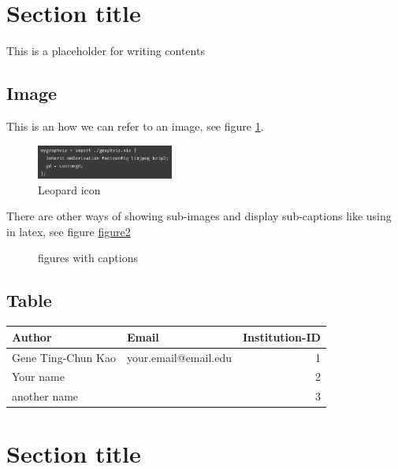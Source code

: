\documentclass[a4paper,11pt]{article}
\author{Ryu Shinyoung}
\date{}
\title{}
\begin{document}
\section*{Section title}
\label{sec:org1aff900}

This is a placeholder for writing contents


\subsection*{Image}
\label{sec:org142b079}

This is an how we can refer to an image, see figure \ref{fig:leopard-icon}.

\begin{figure}[htbp]
\centering
\includegraphics[width=0.4\textwidth]{../../img/7/Input pattern.png}
\caption{\label{fig:leopard-icon}Leopard icon}
\end{figure}

There are other ways of showing sub-images and display sub-captions like using in latex,
see figure \href{../../img/7/Input pattern.png}{figure2}

\begin{figure}
    \centering
\caption{\label{fig:subfig}figures with captions}
\end{figure}


\subsection*{Table}
\label{sec:orgeb213b0}

\begin{center}
\begin{tabular}{llr}
Author & Email & Institution-ID\\
\hline
Gene Ting-Chun Kao & your.email@email.edu & 1\\
Your name &  & 2\\
another name &  & 3\\
\end{tabular}
\end{center}



\section*{Section title}
\label{sec:orgc066f39}
\end{document}
